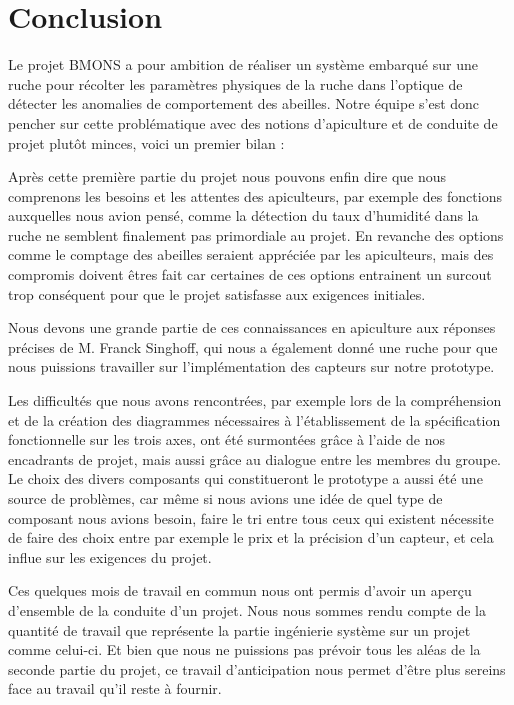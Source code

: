 


\chapter{Conclusion}

Le projet BMONS a pour ambition de réaliser un système embarqué sur une ruche pour récolter les paramètres physiques de la ruche dans l’optique de détecter les anomalies de comportement des abeilles. Notre équipe s’est donc pencher sur cette problématique avec des notions d’apiculture et de conduite de projet plutôt minces, voici un premier bilan :

Après cette première partie du projet nous pouvons enfin dire que nous comprenons les besoins et les attentes des apiculteurs, par exemple des fonctions auxquelles nous avion pensé, comme la détection du taux d'humidité dans la ruche ne semblent finalement pas primordiale au projet. En revanche des options comme le comptage des abeilles seraient appréciée par les apiculteurs, mais des compromis doivent êtres fait car certaines de ces options entrainent un surcout trop conséquent pour que le projet satisfasse aux exigences initiales.\newline 

Nous devons une grande partie de ces connaissances en apiculture aux réponses précises de M. Franck Singhoff, qui nous a également donné une ruche pour que nous puissions travailler sur l'implémentation des capteurs sur notre prototype. \newline 

Les difficultés que nous avons rencontrées, par exemple lors de la compréhension et de la création des diagrammes nécessaires à l’établissement de la spécification fonctionnelle sur les trois axes, ont été surmontées grâce à l’aide de nos encadrants de projet, mais aussi grâce au dialogue entre les membres du groupe. Le choix des divers composants qui constitueront le prototype a aussi été une source de problèmes, car même si nous avions une idée de quel type de composant nous avions besoin, faire le tri entre tous ceux qui existent nécessite de faire des choix entre par exemple le prix et la précision d’un capteur, et cela influe sur les exigences du projet. \newline

Ces quelques mois de travail en commun nous ont permis d'avoir un aperçu d'ensemble de la conduite d'un projet. Nous nous sommes rendu compte de la quantité de travail que représente la partie ingénierie système sur un projet comme celui-ci. Et bien que nous ne puissions pas prévoir tous les aléas de la seconde partie du projet, ce travail d'anticipation nous permet d'être plus sereins face au travail qu'il reste à fournir.\newline​

